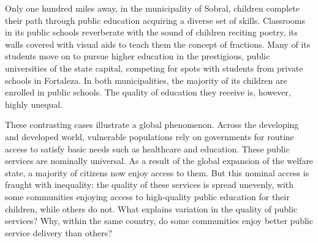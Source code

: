 \documentclass[12pt,]{book}
\newenvironment{Shaded}{\begin{snugshade}}{\end{snugshade}}
\newcommand{\DataTypeTok}[1]{\textcolor[rgb]{0.13,0.29,0.53}{#1}}
\newcommand{\DecValTok}[1]{\textcolor[rgb]{0.00,0.00,0.81}{#1}}
\newcommand{\KeywordTok}[1]{\textcolor[rgb]{0.13,0.29,0.53}{\textbf{#1}}}
\newcommand{\NormalTok}[1]{#1}
\newcommand{\OperatorTok}[1]{\textcolor[rgb]{0.81,0.36,0.00}{\textbf{#1}}}
\newcommand{\StringTok}[1]{\textcolor[rgb]{0.31,0.60,0.02}{#1}}
\begin{document}
Only one hundred miles away, in the municipality of Sobral, children complete their path through public education acquiring a diverse set of skills. Classrooms in its public schools reverberate with the sound of children reciting poetry, its walls covered with visual aids to teach them the concept of fractions. Many of its students move on to pursue higher education in the prestigious, public universities of the state capital, competing for spots with students from private schools in Fortaleza. In both municipalities, the majority of its children are enrolled in public schools. The quality of education they receive is, however, highly unequal.

These contrasting cases illustrate a global phenomenon. Across the developing and developed world, vulnerable populations rely on governments for routine access to satisfy basic needs such as healthcare and education. These public services are nominally universal. As a result of the global expansion of the welfare state, a majority of citizens now enjoy access to them. But this nominal access is fraught with inequality: the quality of these services is spread unevenly, with some communities enjoying access to high-quality public education for their children, while others do not. What explains variation in the quality of public services? Why, within the same country, do some communities enjoy better public service delivery than others?

\begin{Shaded}
\end{Shaded}
\end{document}
